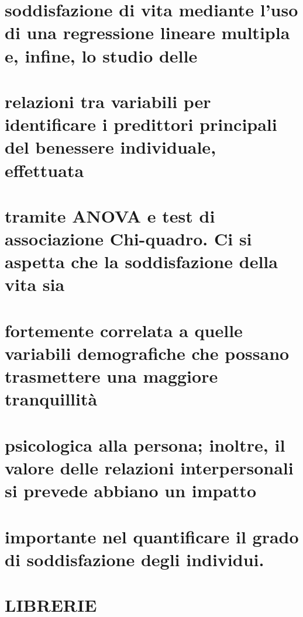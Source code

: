 \documentclass[
]{article}
\begin{document}
\section{soddisfazione di vita mediante l'uso di una regressione lineare
multipla e, infine, lo studio
delle}\label{soddisfazione-di-vita-mediante-luso-di-una-regressione-lineare-multipla-e-infine-lo-studio-delle}

\section{relazioni tra variabili per identificare i predittori
principali del benessere individuale,
effettuata}\label{relazioni-tra-variabili-per-identificare-i-predittori-principali-del-benessere-individuale-effettuata}

\section{tramite ANOVA e test di associazione Chi-quadro. Ci si aspetta
che la soddisfazione della vita
sia}\label{tramite-anova-e-test-di-associazione-chi-quadro.-ci-si-aspetta-che-la-soddisfazione-della-vita-sia}

\section{fortemente correlata a quelle variabili demografiche che
possano trasmettere una maggiore
tranquillità}\label{fortemente-correlata-a-quelle-variabili-demografiche-che-possano-trasmettere-una-maggiore-tranquillituxe0}

\section{psicologica alla persona; inoltre, il valore delle relazioni
interpersonali si prevede abbiano un
impatto}\label{psicologica-alla-persona-inoltre-il-valore-delle-relazioni-interpersonali-si-prevede-abbiano-un-impatto}

\section{importante nel quantificare il grado di soddisfazione degli
individui.}\label{importante-nel-quantificare-il-grado-di-soddisfazione-degli-individui.}

\section{LIBRERIE}\label{librerie}
\end{document}
